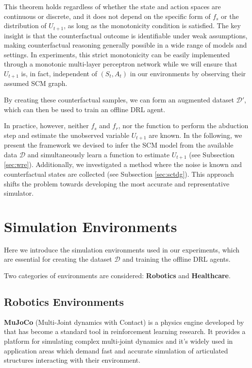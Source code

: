 This theorem holds regardless of whether the state and action spaces are
continuous or discrete, and it does not depend on the specific form of $f_s$
or the distribution of $U_{t+1}$, as long as the monotonicity condition is
satisfied.
The key insight is that the counterfactual outcome is identifiable under
weak assumptions, making counterfactual reasoning generally possible in
a wide range of models and settings.
In experiments, this strict monotonicity can be easily implemented through
a monotonic multi-layer perceptron network
while we will ensure that $U_{t+1}$ is, in fact, independent of $(S_t, A_t)$
in our environments by observing their assumed SCM graph.

By creating these counterfactual samples, we can form an augmented dataset
\( \mathcal{D}' \), which can then be used to train an offline DRL agent.

In practice, however, neither
\( f_s \) and \( f_r \), nor the function to perform
the abduction step and estimate the unobserved variable
\( U_{t+1} \) are known. In the following, we present the framework
we devised to infer the SCM model from the available data \( \mathcal{D} \)
and simultaneously learn a function to estimate
\( U_{t+1} \) (see Subsection \ref{sec:wre}). Additionally, we investigated
a method where the noise is known and counterfactual states are collected
(see Subsection \ref{sec:sctdg}).
This approach shifts the problem towards developing the most accurate and
representative simulator.

\section{Simulation Environments}

Here we introduce the simulation environments used in our experiments,
which are essential for creating the dataset \( \mathcal{D} \) and
training the offline DRL agents.

Two categories of environments are considered: \textbf{Robotics} and
\textbf{Healthcare}.

\subsection{Robotics Environments}

\textbf{MuJoCo} (Multi-Joint dynamics with Contact)
is a physics engine developed by \cite{todorov2012mujoco}
that has become a standard tool in reinforcement learning research.
It provides a platform for simulating complex multi-joint dynamics
and it's widely used in application areas which
demand fast and accurate simulation of articulated
structures interacting with their environment.

